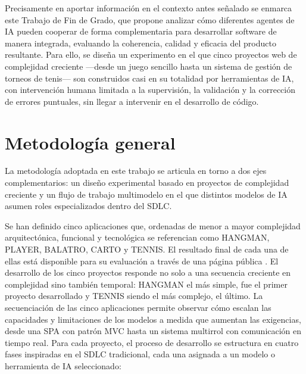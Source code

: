 Precisamente en aportar información en el contexto antes señalado se enmarca este Trabajo de Fin de Grado, que propone analizar cómo diferentes agentes de \ac{IA} pueden cooperar de forma complementaria para desarrollar software de manera integrada, evaluando la coherencia, calidad y eficacia del producto resultante. Para ello, se diseña un experimento en el que cinco proyectos web de complejidad creciente ---desde un juego sencillo hasta un sistema de gestión de torneos de tenis--- son construidos casi en su totalidad por herramientas de \ac{IA}, con intervención humana limitada a la supervisión, la validación y la corrección de errores puntuales, sin llegar a intervenir en el desarrollo de código.

\section{Metodología general} \label{sec:metodologia-general}

La metodología adoptada en este trabajo se articula en torno a dos ejes complementarios: un diseño experimental basado en proyectos de complejidad creciente y un flujo de trabajo multimodelo en el que distintos modelos de \ac{IA} asumen roles especializados dentro del \ac{SDLC}. 

Se han definido cinco aplicaciones que, ordenadas de menor a mayor complejidad arquitectónica, funcional y tecnológica se referencian como \ac{HANGMAN}, \ac{PLAYER}, \ac{BALATRO}, \ac{CARTO} y \ac{TENNIS}. 
El resultado final de cada una de ellas está disponible para su evaluación a través de una página pública \cite{URL::TFG-Web}.
El desarrollo de los cinco proyectos responde no solo a una secuencia creciente en complejidad sino también temporal: \ac{HANGMAN} el más simple, fue el primer proyecto desarrollado y \ac{TENNIS} siendo el más complejo, el último. 
La secuenciación de las cinco aplicaciones permite observar cómo escalan las capacidades y limitaciones de los modelos a medida que aumentan las exigencias, desde una \ac{SPA} con patrón \ac{MVC} hasta un sistema multirrol con comunicación en tiempo real. Para cada proyecto, el proceso de desarrollo se estructura en cuatro fases inspiradas en el \ac{SDLC}  tradicional, cada una asignada a un modelo o herramienta de \ac{IA} seleccionado:\\

